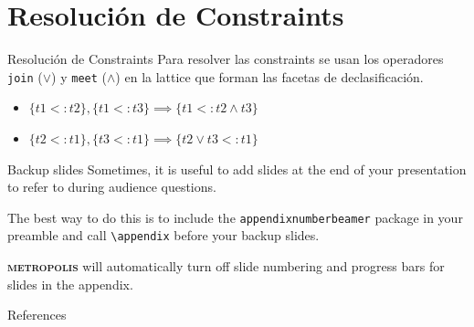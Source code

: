 \documentclass[aspectratio=169,10pt]{beamer}
\newcommand{\themename}{\textbf{\textsc{metropolis}}\xspace}
\begin{document}
\section{Resolución de Constraints}
\begin{frame}[fragile]{Resolución de Constraints}
  Para resolver las constraints se usan los operadores \texttt{join} ($\lor$) y \texttt{meet} ($\land$) en la lattice que forman las facetas de declasificación.
  \begin{itemize}
    \item{$\{t1 <: t2\}, \{t1 <: t3\} \implies \{t1 <: t2 \land t3 \} $}
    \item{$\{t2 <: t1\}, \{t3 <: t1\} \implies \{t2 \lor t3 <: t1\} $}
  \end{itemize}
\end{frame}

{
\begin{frame}[standout]

\end{frame}
}

\appendix

\begin{frame}[fragile]{Backup slides}
  Sometimes, it is useful to add slides at the end of your presentation to
  refer to during audience questions.

  The best way to do this is to include the \verb|appendixnumberbeamer|
  package in your preamble and call \verb|\appendix| before your backup slides.

  \themename will automatically turn off slide numbering and progress bars for
  slides in the appendix.
\end{frame}

\begin{frame}[allowframebreaks]{References}

  
  

\end{frame}
\end{document}
